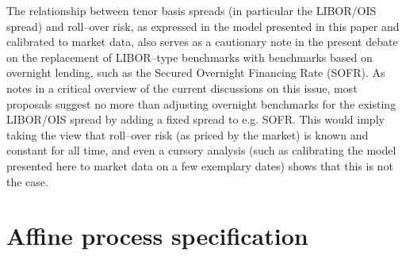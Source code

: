 \documentclass[12pt,a4paper]{article}
\theoremstyle{plain}
\numberwithin{equation}{section}
\begin{document}
The relationship between tenor basis spreads (in particular the LIBOR/OIS spread) and roll--over risk, as expressed in the model presented in this paper and calibrated to market data, also serves as a cautionary note in the present debate on the replacement of LIBOR--type benchmarks with benchmarks based on overnight lending, such as the Secured Overnight Financing Rate (SOFR). As  notes in a critical overview of the current discussions on this issue, most proposals suggest no more than adjusting overnight benchmarks for the existing LIBOR/OIS spread by adding a fixed spread to e.g. SOFR. This would imply taking the view that roll--over risk (as priced by the market) is known and constant for all time, and even a cursory analysis (such as calibrating the model presented here to market data on a few exemplary dates) shows that this is not the case.

\appendix

\section{Affine process specification}\label{affine}
\end{document}
